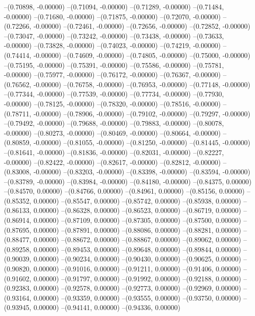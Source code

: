 --(0.70898, -0.00000)
--(0.71094, -0.00000)
--(0.71289, -0.00000)
--(0.71484, -0.00000)
--(0.71680, -0.00000)
--(0.71875, -0.00000)
--(0.72070, -0.00000)
--(0.72266, -0.00000)
--(0.72461, -0.00000)
--(0.72656, -0.00000)
--(0.72852, -0.00000)
--(0.73047, -0.00000)
--(0.73242, -0.00000)
--(0.73438, -0.00000)
--(0.73633, -0.00000)
--(0.73828, -0.00000)
--(0.74023, -0.00000)
--(0.74219, -0.00000)
--(0.74414, -0.00000)
--(0.74609, -0.00000)
--(0.74805, -0.00000)
--(0.75000, -0.00000)
--(0.75195, -0.00000)
--(0.75391, -0.00000)
--(0.75586, -0.00000)
--(0.75781, -0.00000)
--(0.75977, -0.00000)
--(0.76172, -0.00000)
--(0.76367, -0.00000)
--(0.76562, -0.00000)
--(0.76758, -0.00000)
--(0.76953, -0.00000)
--(0.77148, -0.00000)
--(0.77344, -0.00000)
--(0.77539, -0.00000)
--(0.77734, -0.00000)
--(0.77930, -0.00000)
--(0.78125, -0.00000)
--(0.78320, -0.00000)
--(0.78516, -0.00000)
--(0.78711, -0.00000)
--(0.78906, -0.00000)
--(0.79102, -0.00000)
--(0.79297, -0.00000)
--(0.79492, -0.00000)
--(0.79688, -0.00000)
--(0.79883, -0.00000)
--(0.80078, -0.00000)
--(0.80273, -0.00000)
--(0.80469, -0.00000)
--(0.80664, -0.00000)
--(0.80859, -0.00000)
--(0.81055, -0.00000)
--(0.81250, -0.00000)
--(0.81445, -0.00000)
--(0.81641, -0.00000)
--(0.81836, -0.00000)
--(0.82031, -0.00000)
--(0.82227, -0.00000)
--(0.82422, -0.00000)
--(0.82617, -0.00000)
--(0.82812, -0.00000)
--(0.83008, -0.00000)
--(0.83203, -0.00000)
--(0.83398, -0.00000)
--(0.83594, -0.00000)
--(0.83789, -0.00000)
--(0.83984, -0.00000)
--(0.84180, -0.00000)
--(0.84375, 0.00000)
--(0.84570, 0.00000)
--(0.84766, 0.00000)
--(0.84961, 0.00000)
--(0.85156, 0.00000)
--(0.85352, 0.00000)
--(0.85547, 0.00000)
--(0.85742, 0.00000)
--(0.85938, 0.00000)
--(0.86133, 0.00000)
--(0.86328, 0.00000)
--(0.86523, 0.00000)
--(0.86719, 0.00000)
--(0.86914, 0.00000)
--(0.87109, 0.00000)
--(0.87305, 0.00000)
--(0.87500, 0.00000)
--(0.87695, 0.00000)
--(0.87891, 0.00000)
--(0.88086, 0.00000)
--(0.88281, 0.00000)
--(0.88477, 0.00000)
--(0.88672, 0.00000)
--(0.88867, 0.00000)
--(0.89062, 0.00000)
--(0.89258, 0.00000)
--(0.89453, 0.00000)
--(0.89648, 0.00000)
--(0.89844, 0.00000)
--(0.90039, 0.00000)
--(0.90234, 0.00000)
--(0.90430, 0.00000)
--(0.90625, 0.00000)
--(0.90820, 0.00000)
--(0.91016, 0.00000)
--(0.91211, 0.00000)
--(0.91406, 0.00000)
--(0.91602, 0.00000)
--(0.91797, 0.00000)
--(0.91992, 0.00000)
--(0.92188, 0.00000)
--(0.92383, 0.00000)
--(0.92578, 0.00000)
--(0.92773, 0.00000)
--(0.92969, 0.00000)
--(0.93164, 0.00000)
--(0.93359, 0.00000)
--(0.93555, 0.00000)
--(0.93750, 0.00000)
--(0.93945, 0.00000)
--(0.94141, 0.00000)
--(0.94336, 0.00000)
